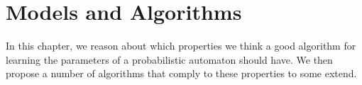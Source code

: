 \chapter{Models and Algorithms}
In this chapter, we reason about which properties we think a good algorithm for learning the parameters of a probabilistic automaton should have.
We then propose a number of algorithms that comply to these properties to some extend.





